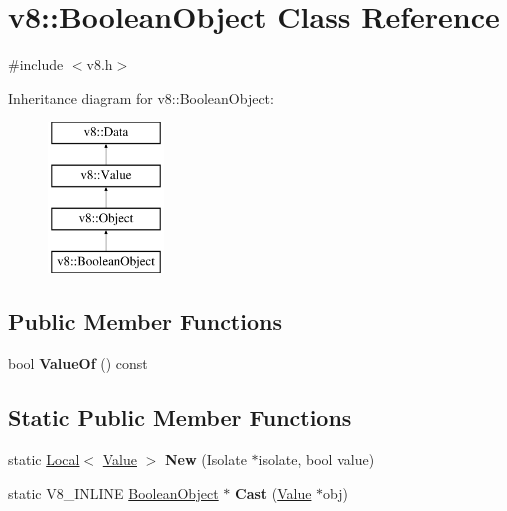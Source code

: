 \hypertarget{classv8_1_1BooleanObject}{}\section{v8\+:\+:Boolean\+Object Class Reference}
\label{classv8_1_1BooleanObject}


{\ttfamily \#include $<$v8.\+h$>$}

Inheritance diagram for v8\+:\+:Boolean\+Object\+:\begin{figure}[H]
\begin{center}
\leavevmode
\includegraphics[height=4.000000cm]{classv8_1_1BooleanObject}
\end{center}
\end{figure}
\subsection*{Public Member Functions}
\begin{DoxyCompactItemize}
\item 
\mbox{\label{classv8_1_1BooleanObject_a4f2f60a73ce9a730dd43046672b7b58b}} 
bool {\bfseries Value\+Of} () const
\end{DoxyCompactItemize}
\subsection*{Static Public Member Functions}
\begin{DoxyCompactItemize}
\item 
\mbox{\label{classv8_1_1BooleanObject_aaf29c0574a8366453ddb5a3d4f178ca4}} 
static \mbox{\hyperlink{classv8_1_1Local}{Local}}$<$ \mbox{\hyperlink{classv8_1_1Value}{Value}} $>$ {\bfseries New} (Isolate $\ast$isolate, bool value)
\item 
\mbox{\label{classv8_1_1BooleanObject_a30b2a406f4dd98660c9b8f6030b3f914}} 
static V8\+\_\+\+I\+N\+L\+I\+NE \mbox{\hyperlink{classv8_1_1BooleanObject}{Boolean\+Object}} $\ast$ {\bfseries Cast} (\mbox{\hyperlink{classv8_1_1Value}{Value}} $\ast$obj)
\end{DoxyCompactItemize}


